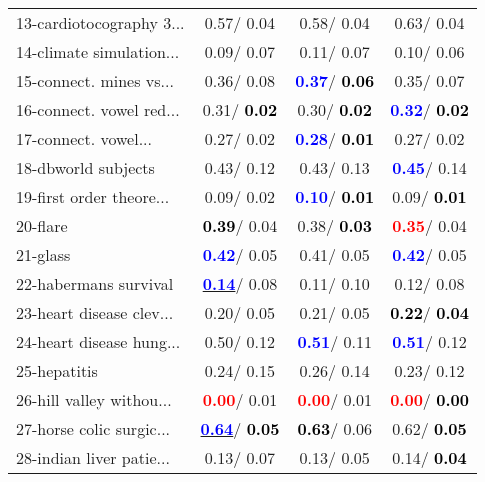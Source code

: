 \begin{table}[h]
\begin{center}
\begin{tabular}{lc|c|c}
13-cardiotocography 3... &   0.57/  0.04 &   0.58/  0.04 &   0.63/  0.04 \\
14-climate simulation... &   0.09/  0.07 &   0.11/  0.07 &   0.10/  0.06 \\ \hline
15-connect. mines vs... &   0.36/  0.08 & \textcolor{blue}{\textbf{  0.37}}/\textcolor{black}{\textbf{  0.06}} &   0.35/  0.07 \\
16-connect. vowel red... &   0.31/\textcolor{black}{\textbf{  0.02}} &   0.30/\textcolor{black}{\textbf{  0.02}} & \textcolor{blue}{\textbf{  0.32}}/\textcolor{black}{\textbf{  0.02}} \\
17-connect. vowel... &   0.27/  0.02 & \textcolor{blue}{\textbf{  0.28}}/\textcolor{black}{\textbf{  0.01}} &   0.27/  0.02 \\
18-dbworld subjects &   0.43/  0.12 &   0.43/  0.13 & \textcolor{blue}{\textbf{  0.45}}/  0.14 \\
19-first order theore... &   0.09/  0.02 & \textcolor{blue}{\textbf{  0.10}}/\textcolor{black}{\textbf{  0.01}} &   0.09/\textcolor{black}{\textbf{  0.01}} \\
20-flare & \textcolor{black}{\textbf{  0.39}}/  0.04 &   0.38/\textcolor{black}{\textbf{  0.03}} & \textcolor{red}{\textbf{  0.35}}/  0.04 \\
21-glass & \textcolor{blue}{\textbf{  0.42}}/  0.05 &   0.41/  0.05 & \textcolor{blue}{\textbf{  0.42}}/  0.05 \\ \hline
22-habermans survival & \underline{\textcolor{blue}{\textbf{  0.14}}}/  0.08 &   0.11/  0.10 &   0.12/  0.08 \\
23-heart disease clev... &   0.20/  0.05 &   0.21/  0.05 & \textcolor{black}{\textbf{  0.22}}/\textcolor{black}{\textbf{  0.04}} \\
24-heart disease hung... &   0.50/  0.12 & \textcolor{blue}{\textbf{  0.51}}/  0.11 & \textcolor{blue}{\textbf{  0.51}}/  0.12 \\
25-hepatitis &   0.24/  0.15 &   0.26/  0.14 &   0.23/  0.12 \\
26-hill valley withou... & \textcolor{red}{\textbf{  0.00}}/  0.01 & \textcolor{red}{\textbf{  0.00}}/  0.01 & \textcolor{red}{\textbf{  0.00}}/\textcolor{black}{\textbf{  0.00}} \\
27-horse colic surgic... & \underline{\textcolor{blue}{\textbf{  0.64}}}/\textcolor{black}{\textbf{  0.05}} & \textcolor{black}{\textbf{  0.63}}/  0.06 &   0.62/\textcolor{black}{\textbf{  0.05}} \\
28-indian liver patie... &   0.13/  0.07 &   0.13/  0.05 &   0.14/\textcolor{black}{\textbf{  0.04}} \\ \hline

\end{tabular}
\end{center}
\end{table}
